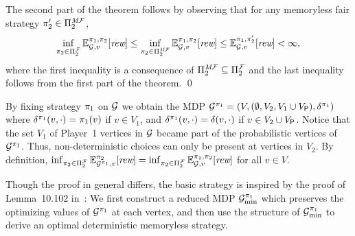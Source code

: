 \begin{myproof}
  
  The second part of the theorem follows by observing that for any
  memoryless fair strategy $\pi_{2}' \in \Pi^{\textit{M}\mathcal{F}}_{2}$,
  \[\inf_{\pi_{2} \in \Pi^{\mathcal{F}}_{2}} \mathbb{E}^{\pi_{1}, \pi_{2}}_{\mathcal{G},v}[\textit{rew}]
  \leq \inf_{\pi_{2} \in \Pi^{\textit{M}\mathcal{F}}_{2}} \mathbb{E}^{\pi_{1}, \pi_{2}}_{\mathcal{G},v}[\textit{rew}]
  \leq \mathbb{E}^{\pi_{1}, \pi_{2}'}_{\mathcal{G},v}[\textit{rew}] < \infty,\]
  where the first inequality is a consequence of 
  $\Pi^{\textit{M}\mathcal{F}}_{2}\subseteq\Pi^{\mathcal{F}}_{2}$ and the last
  inequality follows from the first part of the theorem.  \qed
\end{myproof}


\begin{myproof}
  By fixing strategy $\pi_{1}$ on $\mathcal{G}$ we obtain the MDP
  $\mathcal{G}^{\pi_{1}} = (V, (\emptyset,V_2,V_1\cup V_{\mathsf{P}}),\delta^{\pi_{1}})$
  where $\delta^{\pi_{1}}(v,\cdot)=\pi_{1}(v)$ if $v\in V_1$, and
  $\delta^{\pi_{1}}(v,\cdot)=\delta(v,\cdot)$ if $v\in V_2\cup V_{\mathsf{P}}$.
  Notice that the set $V_1$ of Player~1 vertices in $\mathcal{G}$ became
  part of the probabilistic vertices of $\mathcal{G}^{\pi_{1}}$.  Thus,
  non-deterministic choices can only be present at vertices in $V_2$.
  By definition,
  $\inf_{\pi_{2} \in \Pi^{\mathcal{F}}_{2}} \mathbb{E}^{\pi_{2}}_{\mathcal{G}^{\pi_{1}},v}[\textit{rew}] =
  \inf_{\pi_{2} \in \Pi^{\mathcal{F}}_{2}} \mathbb{E}^{\pi_{1}, \pi_{2}}_{\mathcal{G},v}[\textit{rew}]$
  for all $v\in V$.

  Though the proof in general differs, the basic strategy is inspired
  by the proof of Lemma~10.102 in~\cite{BaierK08}: We first construct
  a reduced MDP $\mathcal{G}^{\pi_{1}}_{\min}$ which preserves the
  optimizing values of $\mathcal{G}^{\pi_{1}}$ at each vertex, and then
  use the structure of $\mathcal{G}^{\pi_{1}}_{\min}$ to derive an
  optimal deterministic memoryless strategy.


\end{myproof}
